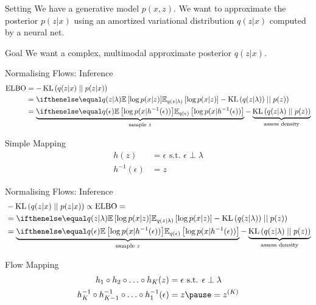 \documentclass[14pt]{beamer}
\begin{document}
\begin{frame}{Setting}
We have a generative model $ p(x,z) $. We want to approximate the posterior $ p(z|x) $ using an amortized variational distribution $ q(z|x) $ computed by a neural net.
\pause
\begin{block}{Goal}
We want a complex, multimodal approximate posterior $ q(z|x) $.
\end{block}
\end{frame}

\begin{frame}{Normalising Flows: Inference}
\begin{equation*}
\begin{aligned}
\ELBO &= -\KL{q(z|x)}{p(z|x)} \\
&= \E[q(z|\lambda)]{\log p(x|z)} - \KL{q(z|\lambda))}{p(z)} \\
&= \underbrace{\E[q(\epsilon)]{\log p(x|h^{-1}(\epsilon))}}_{\text{sample $ z $}} - \underbrace{\KL{q(z|\lambda)}{p(z)}}_{\text{assess density}}
\end{aligned}
\end{equation*}
\begin{block}{Simple Mapping}
\begin{equation*}
\begin{aligned}
h(z) &= \epsilon \text{ s.t. } \epsilon \perp \lambda \\
h^{-1}(\epsilon) &= z
\end{aligned}
\end{equation*}
\end{block}
\end{frame}

\begin{frame}{Normalising Flows: Inference}
\begin{equation*}
\begin{aligned}
&-\KL{q(z|x)}{p(z|x)} \propto \ELBO = \\
&= \E[q(z|\lambda)]{\log p(x|z)} - \KL{q(z|\lambda))}{p(z)} \\
&= \underbrace{\E[q(\epsilon)]{\log p(x|h^{-1}(\epsilon))}}_{\text{sample $ z $}} - \underbrace{\KL{q(z|\lambda)}{p(z)}}_{\text{assess density}}
\end{aligned}
\end{equation*}
\begin{block}{Flow Mapping}
\begin{equation*}
\begin{aligned}
h_{1}\circ h_{2}\circ \ldots \circ h_{K}(z) &= \epsilon \text{ s.t. } \epsilon \perp \lambda \\
h^{-1}_{K}\circ h^{-1}_{K-1}\circ\ldots \circ h^{-1}_{1}(\epsilon) &= z \pause = z^{(K)}
\end{aligned}
\end{equation*}
\end{block}
\end{frame}
\end{document}
